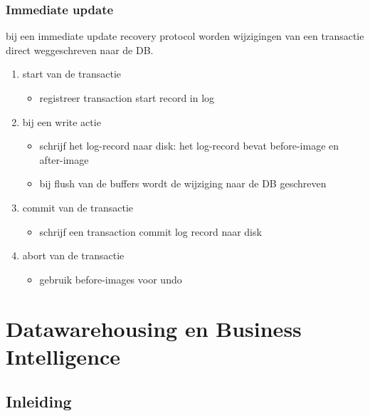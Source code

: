\documentclass[a4paper,12pt]{article}
\begin{document}
\subsubsection{Immediate update}
bij een immediate update recovery protocol worden wijzigingen van een transactie direct weggeschreven naar de DB.
\begin{enumerate}
\item start van de transactie
	\begin{itemize}
	\item registreer transaction start record in log
	\end{itemize}
\item bij een write actie
	\begin{itemize}
	\item schrijf het log-record naar disk: het log-record bevat before-image en after-image
	\item bij flush van de buffers wordt de wijziging naar de DB geschreven
	\end{itemize}
\item commit van de transactie
	\begin{itemize}
	\item schrijf een transaction commit log record naar disk
	\end{itemize}
\item abort van de transactie
	\begin{itemize}
	\item gebruik before-images voor undo
	\end{itemize}
\end{enumerate}

\section{Datawarehousing en Business Intelligence}
\subsection{Inleiding}
\end{document}
